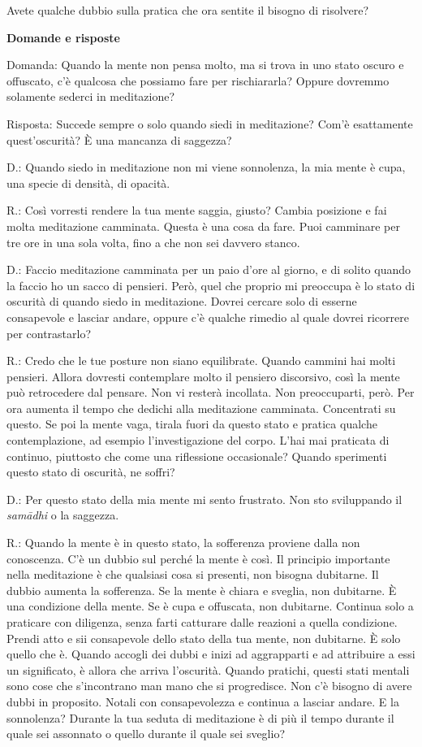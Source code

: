 Avete qualche dubbio sulla pratica che ora sentite il bisogno di
risolvere?

\textbf{Domande e risposte}

Domanda: Quando la mente non pensa molto, ma si trova in uno stato
oscuro e offuscato, c'è qualcosa che possiamo fare per rischiararla?
Oppure dovremmo solamente sederci in meditazione?

Risposta: Succede sempre o solo quando siedi in meditazione? Com'è
esattamente quest'oscurità? È una mancanza di saggezza?

D.: Quando siedo in meditazione non mi viene sonnolenza, la mia mente è
cupa, una specie di densità, di opacità.

R.: Così vorresti rendere la tua mente saggia, giusto? Cambia posizione
e fai molta meditazione camminata. Questa è una cosa da fare. Puoi
camminare per tre ore in una sola volta, fino a che non sei davvero
stanco.

D.: Faccio meditazione camminata per un paio d'ore al giorno, e di
solito quando la faccio ho un sacco di pensieri. Però, quel che proprio
mi preoccupa è lo stato di oscurità di quando siedo in meditazione.
Dovrei cercare solo di esserne consapevole e lasciar andare, oppure c'è
qualche rimedio al quale dovrei ricorrere per contrastarlo?

R.: Credo che le tue posture non siano equilibrate. Quando cammini hai
molti pensieri. Allora dovresti contemplare molto il pensiero
discorsivo, così la mente può retrocedere dal pensare. Non vi resterà
incollata. Non preoccuparti, però. Per ora aumenta il tempo che dedichi
alla meditazione camminata. Concentrati su questo. Se poi la mente vaga,
tirala fuori da questo stato e pratica qualche contemplazione, ad
esempio l'investigazione del corpo. L'hai mai praticata di continuo,
piuttosto che come una riflessione occasionale? Quando sperimenti questo
stato di oscurità, ne soffri?

D.: Per questo stato della mia mente mi sento frustrato. Non sto
sviluppando il \emph{samādhi} o la saggezza.

R.: Quando la mente è in questo stato, la sofferenza proviene dalla non
conoscenza. C'è un dubbio sul perché la mente è così. Il principio
importante nella meditazione è che qualsiasi cosa si presenti, non
bisogna dubitarne. Il dubbio aumenta la sofferenza. Se la mente è chiara
e sveglia, non dubitarne. È una condizione della mente. Se è cupa e
offuscata, non dubitarne. Continua solo a praticare con diligenza, senza
farti catturare dalle reazioni a quella condizione. Prendi atto e sii
consapevole dello stato della tua mente, non dubitarne. È solo quello
che è. Quando accogli dei dubbi e inizi ad aggrapparti e ad attribuire a
essi un significato, è allora che arriva l'oscurità. Quando pratichi,
questi stati mentali sono cose che s'incontrano man mano che si
progredisce. Non c'è bisogno di avere dubbi in proposito. Notali con
consapevolezza e continua a lasciar andare. E la sonnolenza? Durante la
tua seduta di meditazione è di più il tempo durante il quale sei
assonnato o quello durante il quale sei sveglio?


